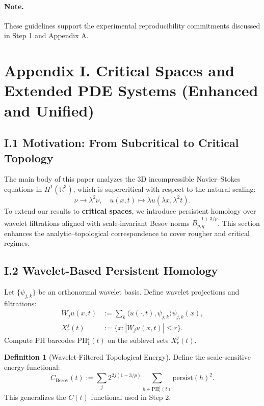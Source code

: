 \documentclass[11pt]{article}
\theoremstyle{definition}
\newtheorem{definition}[theorem]{Definition}
\begin{document}
\paragraph{Note.} These guidelines support the experimental reproducibility commitments discussed in Step 1 and Appendix A.


\section*{Appendix I. Critical Spaces and Extended PDE Systems (Enhanced and Unified)}

\subsection*{I.1 Motivation: From Subcritical to Critical Topology}
The main body of this paper analyzes the 3D incompressible Navier--Stokes equations in $H^1(\mathbb{R}^3)$, which is supercritical with respect to the natural scaling:
\[
\nu \to \lambda^2 \nu, \quad u(x,t) \mapsto \lambda u(\lambda x, \lambda^2 t).
\]
To extend our results to \textbf{critical spaces}, we introduce persistent homology over wavelet filtrations aligned with scale-invariant Besov norms $\dot{B}^{-1+3/p}_{p,q}$. This section enhances the analytic--topological correspondence to cover rougher and critical regimes.

\subsection*{I.2 Wavelet-Based Persistent Homology}
Let $\{\psi_{j,k}\}$ be an orthonormal wavelet basis. Define wavelet projections and filtrations:
\begin{align*}
W_j u(x,t) &:= \sum_k \langle u(\cdot, t), \psi_{j,k} \rangle \psi_{j,k}(x), \\
X^j_r(t) &:= \{x : |W_j u(x,t)| \leq r\}.
\end{align*}
Compute PH barcodes $\mathrm{PH}^j_1(t)$ on the sublevel sets $X^j_r(t)$.

\begin{definition}[Wavelet-Filtered Topological Energy]
Define the scale-sensitive energy functional:
\[
C_{\mathrm{Besov}}(t) := \sum_j 2^{2j(1 - 3/p)} \sum_{h \in \mathrm{PH}^j_1(t)} \mathrm{persist}(h)^2.
\]
This generalizes the $C(t)$ functional used in Step 2.
\end{definition}
\end{document}

